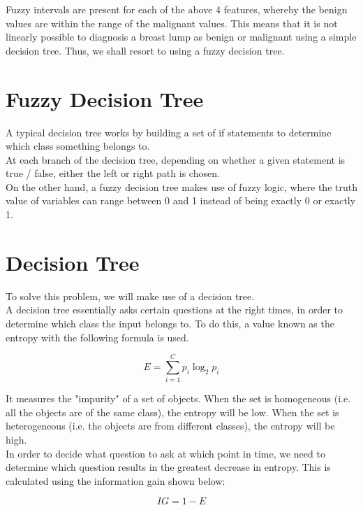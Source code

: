 Fuzzy intervals are present for each of the above 4 features, whereby the benign values are within the range of the malignant values. This means that it is not linearly possible to diagnosis a breast lump as benign or malignant using a simple decision tree. Thus, we shall resort to using a fuzzy decision tree. \\

\section{Fuzzy Decision Tree}
A typical decision tree works by building a set of if statements to determine which class something belongs to. \\

At each branch of the decision tree, depending on whether a given statement is true / false, either the left or right path is chosen. \\

On the other hand, a fuzzy decision tree makes use of fuzzy logic, where the truth value of variables can range between 0 and 1 instead of being exactly 0 or exactly 1. \\
\fi

\section{Decision Tree}
To solve this problem, we will make use of a decision tree. \\



 A decision tree essentially asks certain questions at the right times, in order to determine which class the input belongs to. To do this, a value known as the entropy with the following formula is used.

$$E = \sum_{i=1}^{C}p_i\log_2 p_i$$

It measures the "impurity" of a set of objects. When the set is homogeneous (i.e. all the objects are of the same class), the entropy will be low. When the set is heterogeneous (i.e. the objects are from different classes), the entropy will be high. \\

 In order to decide what question to ask at which point in time, we need to determine which question results in the greatest decrease in entropy. This is calculated using the information gain shown below:

$$IG = 1 - E$$

